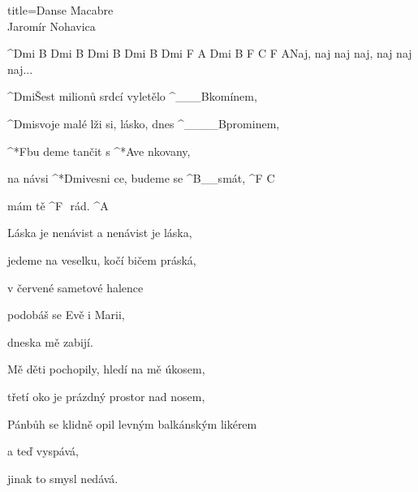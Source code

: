 \begin{song}{title=\predtitle\centering Danse Macabre \\\large Jaromír Nohavica \vspace*{-0.3cm}}  %
\begin{centerjustified}
\nejnejvetsi

	^{Dmi B Dmi B Dmi B Dmi B Dmi F A Dmi B F C F A}{Naj, naj naj naj, naj naj naj\elipsa.\elipsa.\elipsa. \textcolor{white}{\hrulefill }} 

\sloka
	^{Dmi}Šest milionů srdcí vyletělo ^{{\color{white}\_\_\_}B}komínem,

	^{Dmi}svoje malé lži si, lásko, dnes ^{{\color{white}\_\_\_\_}B}prominem,

	^*{F}bu deme tančit s ^*{A}ve nkovany,

	na návsi ^*{Dmi}vesni ce, budeme se ^{B{\color{white}\_\_}}smát, ^{F\,\,C}
	
	mám tě ^{F\,\,\,\,}rád. ^{A}


\sloka
	Láska je nenávist a nenávist je láska,
	
	jedeme na veselku, kočí bičem práská,
	
	v červené sametové halence

	podobáš se Evě i Marii,
	
	dneska mě zabijí.
	

\sloka
	Mě děti pochopily, hledí na mě úkosem,

	třetí oko je prázdný prostor nad nosem,
	
	Pánbůh se klidně opil levným balkánským likérem

	a teď vyspává,
	
	jinak to smysl nedává.

\end{centerjustified}
\setcounter{Slokočet}{0}
\end{song}
